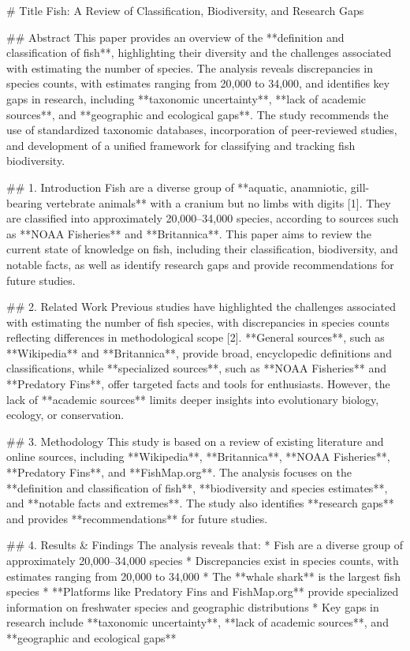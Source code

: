 # Title
Fish: A Review of Classification, Biodiversity, and Research Gaps

## Abstract
This paper provides an overview of the **definition and classification of fish**, highlighting their diversity and the challenges associated with estimating the number of species. The analysis reveals discrepancies in species counts, with estimates ranging from 20,000 to 34,000, and identifies key gaps in research, including **taxonomic uncertainty**, **lack of academic sources**, and **geographic and ecological gaps**. The study recommends the use of standardized taxonomic databases, incorporation of peer-reviewed studies, and development of a unified framework for classifying and tracking fish biodiversity.

## 1. Introduction
Fish are a diverse group of **aquatic, anamniotic, gill-bearing vertebrate animals** with a cranium but no limbs with digits [1]. They are classified into approximately 20,000–34,000 species, according to sources such as **NOAA Fisheries** and **Britannica**. This paper aims to review the current state of knowledge on fish, including their classification, biodiversity, and notable facts, as well as identify research gaps and provide recommendations for future studies.

## 2. Related Work
Previous studies have highlighted the challenges associated with estimating the number of fish species, with discrepancies in species counts reflecting differences in methodological scope [2]. **General sources**, such as **Wikipedia** and **Britannica**, provide broad, encyclopedic definitions and classifications, while **specialized sources**, such as **NOAA Fisheries** and **Predatory Fins**, offer targeted facts and tools for enthusiasts. However, the lack of **academic sources** limits deeper insights into evolutionary biology, ecology, or conservation.

## 3. Methodology
This study is based on a review of existing literature and online sources, including **Wikipedia**, **Britannica**, **NOAA Fisheries**, **Predatory Fins**, and **FishMap.org**. The analysis focuses on the **definition and classification of fish**, **biodiversity and species estimates**, and **notable facts and extremes**. The study also identifies **research gaps** and provides **recommendations** for future studies.

## 4. Results & Findings
The analysis reveals that:
* Fish are a diverse group of approximately 20,000–34,000 species
* Discrepancies exist in species counts, with estimates ranging from 20,000 to 34,000
* The **whale shark** is the largest fish species
* **Platforms like Predatory Fins and FishMap.org** provide specialized information on freshwater species and geographic distributions
* Key gaps in research include **taxonomic uncertainty**, **lack of academic sources**, and **geographic and ecological gaps**

